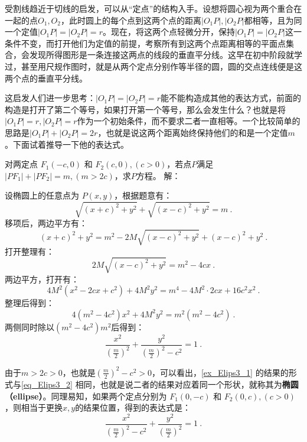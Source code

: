 受割线趋近于切线的启发，可以从“定点”的结构入手。设想将圆心视为两个重合在一起的点$O_1,O_2$，此时圆上的每个点到这两个点的距离$|O_1P|,|O_2P|$都相等，且为同一个定值$|O_1P|=|O_2P|=r$。现在，将这两个点轻微分开，保持$|O_1P|=|O_2P|$这一条件不变，而打开他们为定值的前提，考察所有到这两个点距离相等的平面点集合，会发现所得图形是一条连接这两点的线段的垂直平分线。这早在初中阶段就学过，甚至用尺规作图时，就是从两个定点分别作等半径的圆，圆的交点连线便是这两个点的垂直平分线。

这启发人们进一步思考：$|O_1P|=|O_2P|=r$能不能构造成其他的表达方式，前面的构造是打开了第二个等号，如果打开第一个等号，那么会发生什么？也就是将$|O_1P|=r,|O_2P|=r$作为一个初始条件，而不要求二者一直相等。一个比较简单的思路是$|O_1P|+|O_2P|=2r$，也就是说这两个距离始终保持他们的和是一个定值$m$。下面试着推导一下他的表达式。

\begin{example}{对两定点 $F_1(-c, 0)$ 和 $F_2(c, 0),(c>0)$，若点$P$满足$|PF_1| + |PF_2| = m,(m > 2c)$，求$P$方程。}\label{ex_Elips3_1}
解：

设椭圆上的任意点为 $P(x, y)$，根据题意有：
\begin{equation}
\sqrt{(x + c)^2 + y^2} + \sqrt{(x - c)^2 + y^2} = m~.
\end{equation}
移项后，两边平方有：
\begin{equation}
(x + c)^2 + y^2 = m^2 - 2M\sqrt{(x - c)^2 + y^2} + (x - c)^2 + y^2~.
\end{equation}
打开整理有：
\begin{equation}
2M\sqrt{(x - c)^2 + y^2}= m^2 - 4cx~.
\end{equation}
两边平方，打开有：
\begin{equation}
4M^2(x^2 - 2cx+c^2) + 4M^2y^2= m^4-4M^2\cdot2cx+16c^2x^2~.
\end{equation}
整理后得到：
\begin{equation}
4(m^2 -4c^2)x^2 + 4M^2y^2= m^2(m^2-4c^2)~.
\end{equation}
两侧同时除以$(m^2-4c^2)m^2$后得到：
\begin{equation}\label{eq_Elips3_4}
\frac{x^2}{\left(\displaystyle\frac{m}{2}\right)^2} + \frac{y^2}{\displaystyle\left(\frac{m}{2}\right)^2-c^2}=1~.
\end{equation}
\end{example}

由于$m>2c>0$，也就是$\displaystyle\left(\frac{m}{2}\right)^2-c^2>0$，可以看出，\autoref{ex_Elips3_1} 的结果的形式与\autoref{eq_Elips3_2} 相同，也就是说二者的结果对应着同一个形状，就称其为\textbf{椭圆（ellipse）}。同理易知，如果两个定点分别为 $F_1(0,-c)$ 和 $F_2(0,c),(c>0)$，则相当于更换$x,y$的结果位置，得到的表达式是：
\begin{equation}\label{eq_Elips3_6}
\frac{x^2}{\displaystyle\left(\frac{m}{2}\right)^2-c^2}+\frac{y^2}{\left(\displaystyle\frac{m}{2}\right)^2} =1~.
\end{equation}

